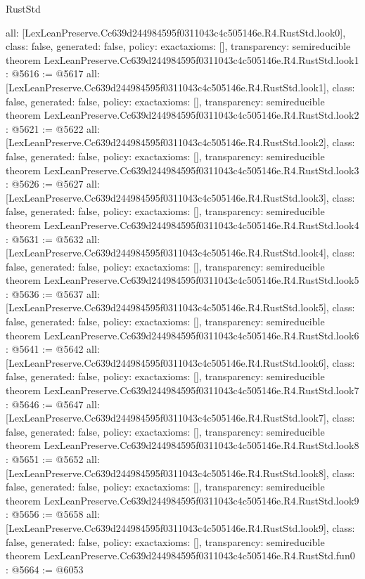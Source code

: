 \begin{lexlean}{RustStd}
\begin{coremodule}
{  all: [LexLeanPreserve.Cc639d244984595f0311043c4c505146e.R4.RustStd.look0],
  class: false,
  generated: false,
  policy: exact{axioms: []},
  transparency: semireducible
}
theorem LexLeanPreserve.Cc639d244984595f0311043c4c505146e.R4.RustStd.look1 : @5616 := @5617 {
  all: [LexLeanPreserve.Cc639d244984595f0311043c4c505146e.R4.RustStd.look1],
  class: false,
  generated: false,
  policy: exact{axioms: []},
  transparency: semireducible
}
theorem LexLeanPreserve.Cc639d244984595f0311043c4c505146e.R4.RustStd.look2 : @5621 := @5622 {
  all: [LexLeanPreserve.Cc639d244984595f0311043c4c505146e.R4.RustStd.look2],
  class: false,
  generated: false,
  policy: exact{axioms: []},
  transparency: semireducible
}
theorem LexLeanPreserve.Cc639d244984595f0311043c4c505146e.R4.RustStd.look3 : @5626 := @5627 {
  all: [LexLeanPreserve.Cc639d244984595f0311043c4c505146e.R4.RustStd.look3],
  class: false,
  generated: false,
  policy: exact{axioms: []},
  transparency: semireducible
}
theorem LexLeanPreserve.Cc639d244984595f0311043c4c505146e.R4.RustStd.look4 : @5631 := @5632 {
  all: [LexLeanPreserve.Cc639d244984595f0311043c4c505146e.R4.RustStd.look4],
  class: false,
  generated: false,
  policy: exact{axioms: []},
  transparency: semireducible
}
theorem LexLeanPreserve.Cc639d244984595f0311043c4c505146e.R4.RustStd.look5 : @5636 := @5637 {
  all: [LexLeanPreserve.Cc639d244984595f0311043c4c505146e.R4.RustStd.look5],
  class: false,
  generated: false,
  policy: exact{axioms: []},
  transparency: semireducible
}
theorem LexLeanPreserve.Cc639d244984595f0311043c4c505146e.R4.RustStd.look6 : @5641 := @5642 {
  all: [LexLeanPreserve.Cc639d244984595f0311043c4c505146e.R4.RustStd.look6],
  class: false,
  generated: false,
  policy: exact{axioms: []},
  transparency: semireducible
}
theorem LexLeanPreserve.Cc639d244984595f0311043c4c505146e.R4.RustStd.look7 : @5646 := @5647 {
  all: [LexLeanPreserve.Cc639d244984595f0311043c4c505146e.R4.RustStd.look7],
  class: false,
  generated: false,
  policy: exact{axioms: []},
  transparency: semireducible
}
theorem LexLeanPreserve.Cc639d244984595f0311043c4c505146e.R4.RustStd.look8 : @5651 := @5652 {
  all: [LexLeanPreserve.Cc639d244984595f0311043c4c505146e.R4.RustStd.look8],
  class: false,
  generated: false,
  policy: exact{axioms: []},
  transparency: semireducible
}
theorem LexLeanPreserve.Cc639d244984595f0311043c4c505146e.R4.RustStd.look9 : @5656 := @5658 {
  all: [LexLeanPreserve.Cc639d244984595f0311043c4c505146e.R4.RustStd.look9],
  class: false,
  generated: false,
  policy: exact{axioms: []},
  transparency: semireducible
}
theorem LexLeanPreserve.Cc639d244984595f0311043c4c505146e.R4.RustStd.fun0 : @5664 := @6053 {
}
\end{coremodule}
\end{lexlean}
